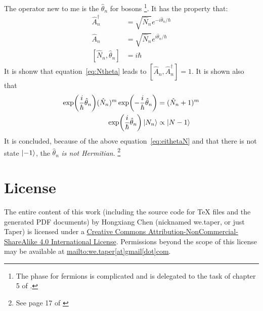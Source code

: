 \documentclass{article}
\begin{document}
The operator new to me is the  $\hat{\theta}_n$ for bosons
\footnote{The phase for fermions is complicated and is delegated to the task of
chapter 5 of \cite{Nagaosa1999}.}. It has the property that:
\begin{align}
    \hat{A}_n^\dagger &= \sqrt{\hat{N}_n} e^{-i\hat{\theta}_n/\hbar} \\
    \hat{A}_n         &= \sqrt{\hat{N}_n} e^{i\hat{\theta}_n/\hbar} \\
    [\hat{N}_n,\hat{\theta}_n] &= i\hbar \label{eq:Ntheta}
\end{align}
It is shonw that equation~\ref{eq:Ntheta} leads to
$[\hat{A}_n,\hat{A}_n^\dagger]=1$. It is shown also that
\begin{align}
    \exp(\frac{i}{\hbar}\hat{\theta}_n) (\hat{N}_n)^m
        \exp(-\frac{i}{\hbar}\hat{\theta}_n) &= (\hat{N}_n+1)^m \\
    \exp(\frac{i}{\hbar}\hat{\theta}_n) \ket{N_n} &\propto \ket{N-1}
    \label{eq:eithetaN}
\end{align}
It is concluded, because of the above equation~\ref{eq:eithetaN} and that there
is not state $\ket{-1}$, the $\hat{\theta}_n$ \textit{is not Hermitian}.
\footnote{See page 17 of \cite{Nagaosa1999}}






\printnomenclature
\section{License}
The entire content of this work (including the source code
for TeX files and the generated PDF documents) by 
Hongxiang Chen (nicknamed we.taper, or just Taper) is
licensed under a 
\href{http://creativecommons.org/licenses/by-nc-sa/4.0/}{Creative 
Commons Attribution-NonCommercial-ShareAlike 4.0 International 
License}. Permissions beyond the scope of this 
license may be available at \url{mailto:we.taper[at]gmail[dot]com}.
\end{document}
